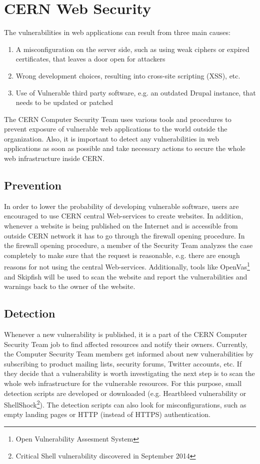 \section{CERN Web Security}
The vulnerabilities in web applications can result from three main causes:
\begin{enumerate}
\item A misconfiguration on the server side, such as using weak ciphers or expired certificates, that leaves a door open for attackers
\item Wrong development choices, resulting into cross-site scripting (XSS), etc.
\item Use of Vulnerable third party software, e.g. an outdated Drupal instance, that needs to be updated or patched
\end{enumerate}
The CERN Computer Security Team uses various tools and procedures to prevent exposure of vulnerable web applications to the world outside the organization. Also, it is important to detect any vulnerabilities in web applications as soon as possible and take necessary actions to secure the whole web infrastructure inside CERN.

\subsection{Prevention}
In order to lower the probability of developing vulnerable software, users are encouraged to use CERN central Web-services to create websites. In addition, whenever a website is being published on the Internet and is accessible from outside CERN network it has to go through the firewall opening procedure. In the firewall opening procedure, a member of the Security Team analyzes the case completely to make sure that the request is reasonable, e.g. there are enough reasons for not using the central Web-services. Additionally, tools like OpenVas\footnote{Open Vulnerability Assesment System} and Skipfish will be used to scan the website and report the vulnerabilities and warnings back to the owner of the website. 

\subsection{Detection}
Whenever a new vulnerability is published, it is a part of the CERN Computer Security Team job to find affected resources and notify their owners. Currently, the Computer Security Team members get informed about new vulnerabilities by subscribing to product mailing lists, security forums, Twitter accounts, etc. If they decide that a vulnerability is worth investigating the next step is to scan the whole web infrastructure for the vulnerable resources. For this purpose, small detection scripts are developed or downloaded (e.g. Heartbleed vulnerability or ShellShock\footnote{Critical Shell vulnerability discovered in September 2014}). The detection scripts can also look for misconfigurations, such as empty landing pages or HTTP (instead of HTTPS) authentication. 


